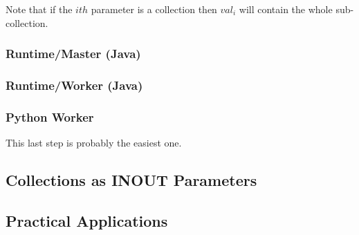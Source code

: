Note that if the $ith$ parameter is a collection then $val_i$ will contain the whole sub-collection.

\subsubsection{Runtime/Master (Java)}
\label{subsubsec:runtime_master_col_in}


\subsubsection{Runtime/Worker (Java)}
\label{subsubsec:runtime_worker_col_in}

\subsubsection{Python Worker}
\label{subsubsec:python_worker_col_in}
This last step is probably the easiest one. 


\subsection{Collections as INOUT Parameters}
\label{subsec:col_inout}

\subsection{Practical Applications}
\label{subsec:col_examples}
